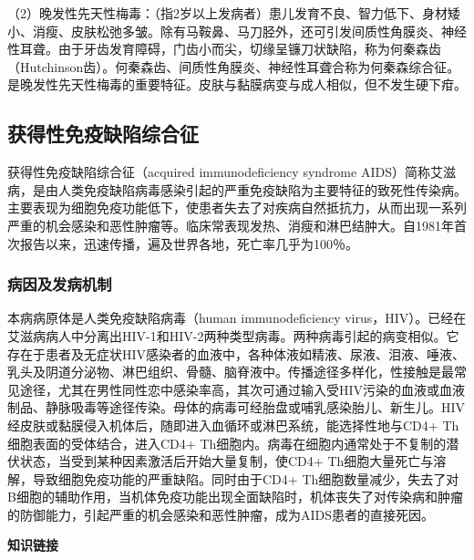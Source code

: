 （2）晚发性先天性梅毒：（指2岁以上发病者）患儿发育不良、智力低下、身材矮小、消瘦、皮肤松弛多皱。除有马鞍鼻、马刀胫外，还可引发间质性角膜炎、神经性耳聋。由于牙齿发育障碍，门齿小而尖，切缘呈镰刀状缺陷，称为何秦森齿（Hutchinson齿）。何秦森齿、间质性角膜炎、神经性耳聋合称为何秦森综合征。是晚发性先天性梅毒的重要特征。皮肤与黏膜病变与成人相似，但不发生硬下疳。

\subsection{获得性免疫缺陷综合征}

获得性免疫缺陷综合征（acquired immunodeficiency syndrome
AIDS）简称艾滋病，是由人类免疫缺陷病毒感染引起的严重免疫缺陷为主要特征的致死性传染病。主要表现为细胞免疫功能低下，使患者失去了对疾病自然抵抗力，从而出现一系列严重的机会感染和恶性肿瘤等。临床常表现发热、消瘦和淋巴结肿大。自1981年首次报告以来，迅速传播，遍及世界各地，死亡率几乎为100％。

\subsubsection{病因及发病机制}

本病病原体是人类免疫缺陷病毒（human immunodeficiency
virus，HIV）。已经在艾滋病病人中分离出HIV-1和HIV-2两种类型病毒。两种病毒引起的病变相似。它存在于患者及无症状HIV感染者的血液中，各种体液如精液、尿液、泪液、唾液、乳头及阴道分泌物、淋巴组织、骨髓、脑脊液中。传播途径多样化，性接触是最常见途径，尤其在男性同性恋中感染率高，其次可通过输入受HIV污染的血液或血液制品、静脉吸毒等途径传染。母体的病毒可经胎盘或哺乳感染胎儿、新生儿。HIV经皮肤或黏膜侵入机体后，随即进入血循环或淋巴系统，能选择性地与CD4{+}
Th细胞表面的受体结合，进入CD4{+}
Th细胞内。病毒在细胞内通常处于不复制的潜伏状态，当受到某种因素激活后开始大量复制，使CD4{+}
Th细胞大量死亡与溶解，导致细胞免疫功能的严重缺陷。同时由于CD4{+}
Th细胞数量减少，失去了对B细胞的辅助作用，当机体免疫功能出现全面缺陷时，机体丧失了对传染病和肿瘤的防御能力，引起严重的机会感染和恶性肿瘤，成为AIDS患者的直接死因。

\begin{center}
    \textbf{知识链接}
\end{center}


